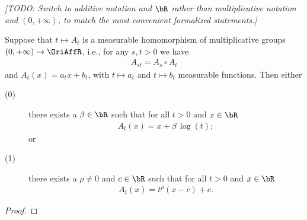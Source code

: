 \begin{theorem}
  \label{thm:one-parameter-subgroups-of-affine-isomorphisms}
  \emph{[TODO: Switch to additive notation and $\bR$ rather than multiplicative
  notation and $(0,+\infty)$, to match the most convenient formalized statements.]}

  Suppose that $t \mapsto A_t$ is a measurable homomorphism of multiplicative groups
  $(0,+\infty) \to \OriAffR$, i.e., for any $s, t > 0$ we have
  \begin{align*}
    A_{s t} = A_s \circ A_t
  \end{align*}
  and $A_t(x) = a_t x + b_t$, with $t \mapsto a_t$ and $t \mapsto b_t$
  measurable functions.
  Then either
  \begin{description}
    \item[(0)] there exists a $\beta \in \bR$ such that for all $t > 0$ and $x \in \bR$
      \begin{align*}
        A_t(x) = x + \beta \, \log(t) ;
      \end{align*}
      or
    \item[(1)] there exists a $\rho \ne 0$ and $c \in \bR$ such that
      for all $t > 0$ and $x \in \bR$
      \begin{align*}
        A_t(x) = t^{\rho} (x - c) + c .
      \end{align*}
  \end{description}
\end{theorem}
\begin{proof}
\end{proof}
